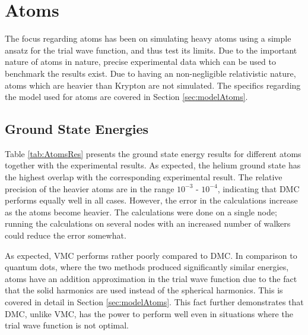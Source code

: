 \section{Atoms}
 
 The focus regarding atoms has been on simulating heavy atoms using a simple ansatz for the trial wave function, and thus test its limits. Due to the important nature of atoms in nature, precise experimental data which can be used to benchmark the results exist. Due to having an non-negligible relativistic nature, atoms which are heavier than Krypton are not simulated. The specifics regarding the model used for atoms are covered in Section \ref{sec:modelAtoms}.
 
\subsection{Ground State Energies}
 
 Table \ref{tab:AtomsRes} presents the ground state energy results for different atoms together with the experimental results. As expected, the helium ground state has the highest overlap with the corresponding experimental result. The relative precision of the heavier atoms are in the range $10^{-3}$ - $10^{-4}$, indicating that DMC performs equally well in all cases. However, the error in the calculations increase as the atoms become heavier. The calculations were done on a single node; running the calculations on several nodes with an increased number of walkers could reduce the error somewhat. 
 
 As expected, VMC performs rather poorly compared to DMC. In comparison to quantum dots, where the two methods produced significantly similar energies, atoms have an addition approximation in the trial wave function due to the fact that the solid harmonics are used instead of the spherical harmonics. This is covered in detail in Section \ref{sec:modelAtoms}. This fact further demonstrates that DMC, unlike VMC, has the power to perform well even in situations where the trial wave function is not optimal. 
 
